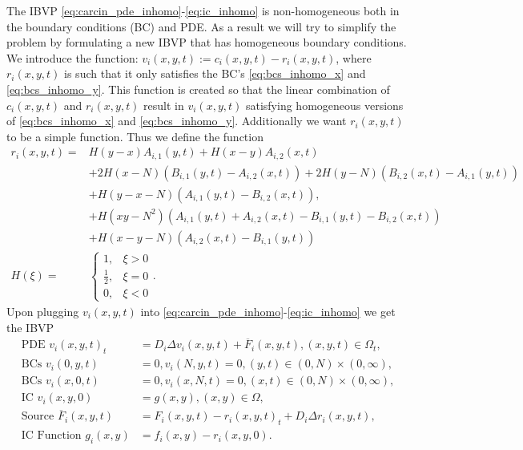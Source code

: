 \documentclass[\main/thesis.tex]{subfiles}
\begin{document}
The IBVP \eqref{eq:carcin_pde_inhomo}-\eqref{eq:ic_inhomo} is non-homogeneous both in the boundary conditions (BC) and PDE. As a result we will try to simplify the problem by formulating a new IBVP that 
has homogeneous boundary conditions. We introduce the function: $v_i(x, y, t) {:=} c_i(x, y, t) {-} r_i(x, y, t)$, where $r_i(x, y, t)$ is such that it only satisfies the BC's \eqref{eq:bcs_inhomo_x} 
and \eqref{eq:bcs_inhomo_y}. This function is created so that the linear combination of $c_i(x, y, t)$ and $r_i(x, y, t)$ result in $v_i(x, y, t)$ satisfying homogeneous versions of 
\eqref{eq:bcs_inhomo_x} and \eqref{eq:bcs_inhomo_y}. Additionally we want $r_i(x, y, t)$ to be a simple function. Thus we define the function
\begin{align}
r_i(x, y, t) {=} &H(y{-}x)A_{i, 1}(y, t) {+} H(x{-}y)A_{i, 2}(x, t) \nonumber\\
				 &{+} 2H(x{-}N)(B_{i, 1}(y, t) {-} A_{i, 2}(x, t)) {+} 2H(y{-}N)(B_{i, 2}(x, t) {-} A_{i, 1}(y, t)) \nonumber\\
				 &{+} H(y{-}x{-}N)(A_{i, 1}(y, t) {-} B_{i, 2}(x, t)), \label{eq:ref_carcin_concen}\\
                 &{+} H(xy{-}N^2)(A_{i, 1}(y, t) {+} A_{i, 2}(x, t) {-} B_{i, 1}(y, t) {-} B_{i, 2}(x, t)) \nonumber\\
                 &{+} H(x{-}y{-}N)(A_{i, 2}(x, t) {-} B_{i, 1}(y, t)) \nonumber\\
H(\xi) {=} &\begin{cases}
	1, &\xi {>} 0 \\
	\frac{1}{2}, &\xi {=} 0 \\
	0, &\xi {<} 0
\end{cases}.
\label{eq:heaviside}
\end{align}
Upon plugging $v_i(x, y, t)$ into \eqref{eq:carcin_pde_inhomo}-\eqref{eq:ic_inhomo} we get the IBVP
\begin{align}
\text{PDE } v_i(x, y, t)_t &{=} D_i\Delta v_i(x, y, t) {+} \overline{F}_i(x, y, t), (x, y, t) {\in} \Omega_t,
\label{eq:carcin_pde_inhomo_v} \\
\text{BCs } v_i(0, y, t) &{=} 0, v_i(N, y, t) {=} 0, (y, t) {\in} (0, N) {\times} (0, \infty),
\label{eq:bcs_homo_x} \\
\text{BCs } v_i(x, 0, t) &{=} 0, v_i(x, N, t) {=} 0, (x, t) {\in} (0, N) {\times} (0, \infty),
\label{eq:bcs_homo_y} \\
\text{IC } v_i(x, y, 0) &{=} g(x, y), (x, y) {\in} \Omega,
\label{eq:ic_inhomo_v} \\
\text{Source } \overline{F}_i(x, y, t) &{=} F_i(x, y, t) {-} r_i(x, y, t)_t {+} D_i\Delta r_i(x, y, t),
\label{eq:source_term_v} \\
\text{IC Function } g_i(x, y) &{=} f_i(x, y) {-} r_i(x, y, 0).
\label{eq:ic_func_inhomo_v}
\end{align}
\end{document}
